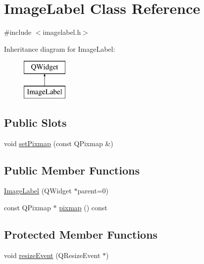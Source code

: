 \hypertarget{class_image_label}{}\section{Image\+Label Class Reference}
\label{class_image_label}


{\ttfamily \#include $<$imagelabel.\+h$>$}

Inheritance diagram for Image\+Label\+:\begin{figure}[H]
\begin{center}
\leavevmode
\includegraphics[height=2.000000cm]{class_image_label}
\end{center}
\end{figure}
\subsection*{Public Slots}
\begin{DoxyCompactItemize}
\item 
void \mbox{\hyperlink{class_image_label_a31004072fa6922806359c845c89fb2bc}{set\+Pixmap}} (const Q\+Pixmap \&)
\end{DoxyCompactItemize}
\subsection*{Public Member Functions}
\begin{DoxyCompactItemize}
\item 
\mbox{\hyperlink{class_image_label_a01bf7ab77bbe3d5d3f58b1cdcccc8667}{Image\+Label}} (Q\+Widget $\ast$parent=0)
\item 
const Q\+Pixmap $\ast$ \mbox{\hyperlink{class_image_label_a0ecf28451887336438cccfe9599a15c2}{pixmap}} () const
\end{DoxyCompactItemize}
\subsection*{Protected Member Functions}
\begin{DoxyCompactItemize}
\item 
void \mbox{\hyperlink{class_image_label_a53568d0398cc9e07d67a5cec1da98ad1}{resize\+Event}} (Q\+Resize\+Event $\ast$)
\end{DoxyCompactItemize}


